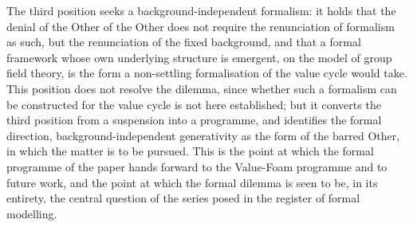 The third position seeks a background-independent formalism: it holds that the denial of the Other of the Other does not require the renunciation of formalism as such, but the renunciation of the fixed background, and that a formal framework whose own underlying structure is emergent, on the model of group field theory, is the form a non-settling formalisation of the value cycle would take. This position does not resolve the dilemma, since whether such a formalism can be constructed for the value cycle is not here established; but it converts the third position from a suspension into a programme, and identifies the formal direction, background-independent generativity as the form of the barred Other, in which the matter is to be pursued. This is the point at which the formal programme of the paper hands forward to the Value-Foam programme and to future work, and the point at which the formal dilemma is seen to be, in its entirety, the central question of the series posed in the register of formal modelling.

